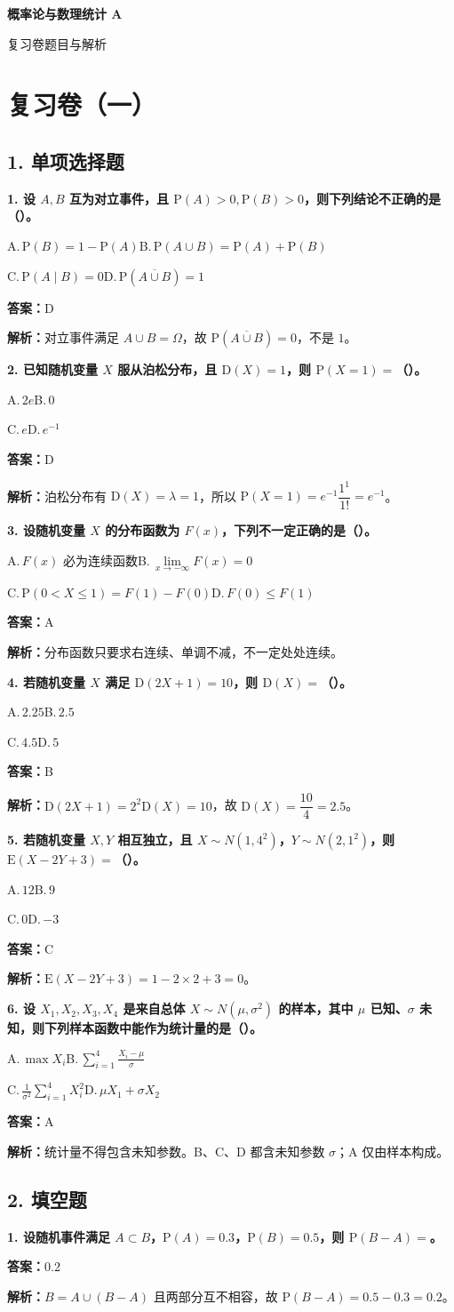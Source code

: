 ﻿\documentclass[UTF8,11pt,a4paper]{ctexart}
\newcommand{\Pp}{\mathrm{P}}
\newcommand{\E}{\mathrm{E}}
\newcommand{\D}{\mathrm{D}}
\newcommand{\Ans}[1]{\par\textbf{答案：}#1\par}
\newcommand{\Ana}[1]{\par\textbf{解析：}#1\par\medskip}
\newcommand{\Opt}[4]{\par A.\,#1\qquad B.\,#2\par C.\,#3\qquad D.\,#4\par}
\newcommand{\Q}[1]{\par\textbf{#1}\par}
\begin{document}
\begin{center}
{\LARGE\bfseries 概率论与数理统计 A\par 复习卷题目与解析}\vspace{0.4em}
\end{center}

\section*{复习卷（一）}
\subsection*{1. 单项选择题}

\Q{1. 设 $A,B$ 互为对立事件，且 $\Pp(A)>0,\Pp(B)>0$，则下列结论不正确的是（\quad）。}
\Opt{$\Pp(B)=1-\Pp(A)$}{$\Pp(A\cup B)=\Pp(A)+\Pp(B)$}{$\Pp(A\mid B)=0$}{$\Pp(\overline{A\cup B})=1$}
\Ans{D}
\Ana{对立事件满足 $A\cup B=\Omega$，故 $\Pp(\overline{A\cup B})=0$，不是 $1$。}

\Q{2. 已知随机变量 $X$ 服从泊松分布，且 $\D(X)=1$，则 $\Pp(X=1)=$（\quad）。}
\Opt{$2e$}{$0$}{$e$}{$e^{-1}$}
\Ans{D}
\Ana{泊松分布有 $\D(X)=\lambda=1$，所以 $\Pp(X=1)=e^{-1}\dfrac{1^1}{1!}=e^{-1}$。}

\Q{3. 设随机变量 $X$ 的分布函数为 $F(x)$，下列不一定正确的是（\quad）。}
\Opt{$F(x)$ 必为连续函数}{$\lim\limits_{x\to-\infty}F(x)=0$}{$\Pp(0<X\le1)=F(1)-F(0)$}{$F(0)\le F(1)$}
\Ans{A}
\Ana{分布函数只要求右连续、单调不减，不一定处处连续。}

\Q{4. 若随机变量 $X$ 满足 $\D(2X+1)=10$，则 $\D(X)=$（\quad）。}
\Opt{$2.25$}{$2.5$}{$4.5$}{$5$}
\Ans{B}
\Ana{$\D(2X+1)=2^2\D(X)=10$，故 $\D(X)=\dfrac{10}{4}=2.5$。}

\Q{5. 若随机变量 $X,Y$ 相互独立，且 $X\sim N(1,4^2)$，$Y\sim N(2,1^2)$，则 $\E(X-2Y+3)=$（\quad）。}
\Opt{$12$}{$9$}{$0$}{$-3$}
\Ans{C}
\Ana{$\E(X-2Y+3)=1-2\times2+3=0$。}

\Q{6. 设 $X_1,X_2,X_3,X_4$ 是来自总体 $X\sim N(\mu,\sigma^2)$ 的样本，其中 $\mu$ 已知、$\sigma$ 未知，则下列样本函数中能作为统计量的是（\quad）。}
\Opt{$\max X_i$}{$\displaystyle\sum_{i=1}^4\frac{X_i-\mu}{\sigma}$}{$\displaystyle\frac1{\sigma^2}\sum_{i=1}^4X_i^2$}{$\mu X_1+\sigma X_2$}
\Ans{A}
\Ana{统计量不得包含未知参数。B、C、D 都含未知参数 $\sigma$；A 仅由样本构成。}

\subsection*{2. 填空题}
\Q{1. 设随机事件满足 $A\subset B$，$\Pp(A)=0.3$，$\Pp(B)=0.5$，则 $\Pp(B-A)=$\underline{\hspace{2cm}}。}
\Ans{$0.2$}
\Ana{$B=A\cup(B-A)$ 且两部分互不相容，故 $\Pp(B-A)=0.5-0.3=0.2$。}
\end{document}
